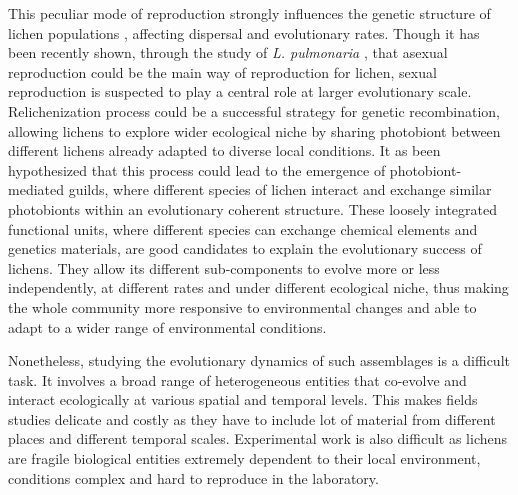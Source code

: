\documentclass[runningheads,a4paper]{llncs}
\begin{document}
This peculiar mode of reproduction strongly influences the genetic structure of lichen populations \cite{dal2012vertical,dal2011phylogeny}, affecting dispersal and evolutionary rates. 
Though it has been recently shown, through the study of {\em L. pulmonaria} \cite{dal2012vertical}, that asexual reproduction could be the main way of reproduction for lichen, sexual reproduction is suspected to play a central role at larger evolutionary scale. Relichenization process could be a successful strategy for genetic recombination, allowing lichens to  explore wider ecological niche by sharing photobiont between different lichens already adapted to diverse local conditions. It as been hypothesized \cite{rikkinen2003ecological} that this process could lead to the emergence of photobiont-mediated guilds, where different species of lichen interact and exchange similar photobionts within an evolutionary coherent structure. These loosely integrated functional units, where different species can exchange chemical elements and genetics materials, are good candidates to explain the evolutionary success of lichens. They allow its different sub-components to evolve more or less independently, at different rates and under different ecological niche, thus making the whole community more responsive to environmental changes and able to adapt to a wider range of environmental conditions.

Nonetheless, studying the evolutionary dynamics of such assemblages is a difficult task. It involves a broad range of heterogeneous entities that co-evolve and interact ecologically at various spatial and temporal levels. This makes fields studies delicate and costly as they have to include lot of material from different places and different temporal scales. Experimental work is also difficult as lichens are fragile biological entities extremely dependent to their local environment, conditions complex and hard to reproduce in the laboratory.    
\end{document}
